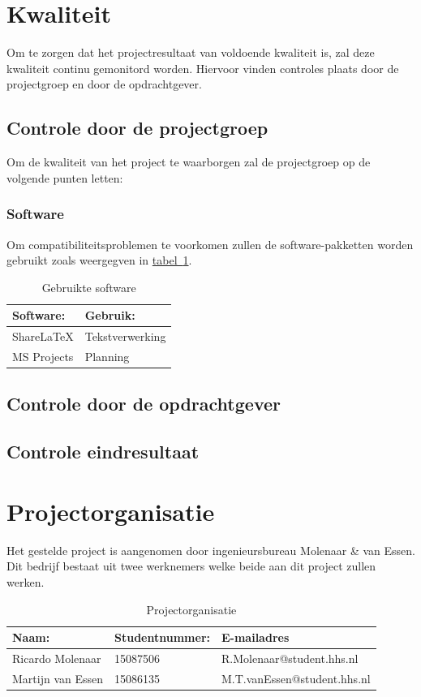 \documentclass[numbers=endperiod]{scrartcl}
\newcommand{\sectionSmall}[1]{
	\vspace{-10pt}
	\section{#1}
	\vspace{-5pt}
}
\newcommand{\tableref}[1]{\hyperref[table:#1]{tabel~\ref{table:#1}}}
\begin{document}
	\sectionSmall{Kwaliteit}
	Om te zorgen dat het projectresultaat van voldoende kwaliteit is, zal deze kwaliteit continu gemonitord worden. Hiervoor vinden controles plaats door de projectgroep en door de opdrachtgever.
	\subsection{Controle door de projectgroep}
	Om de kwaliteit van het project te waarborgen zal de projectgroep op de volgende punten letten:
	\subsubsection{Software}
	Om compatibiliteitsproblemen te voorkomen zullen de software-pakketten worden gebruikt zoals weergegven in \tableref{Software}.
	
	\begin{table}[h]
		\caption{Gebruikte software}\label{table:Software}
		
		\centering
		\begin{tabular}{ p{} | p{} }
			Software:	    & Gebruik:          \\ \hline
			ShareLaTeX   	& Tekstverwerking	\\
			MS Projects    	& Planning  		\\
		\end{tabular}
		
	\end{table}
	
	\subsection{Controle door de opdrachtgever}
	\subsection{Controle eindresultaat}
	\sectionSmall{Projectorganisatie}
	Het gestelde project is aangenomen door ingenieursbureau Molenaar \& van Essen. Dit bedrijf bestaat uit
	twee werknemers welke beide aan dit project zullen werken. 
	\begin{table}[h]
		\caption{Projectorganisatie}\label{table:Projectorganisatie}
		
		\centering
		\begin{tabular}{ p{} | p{} | p{} }
			Naam: 				& Studentnummer:& E-mailadres \\ \hline
			Ricardo Molenaar 	& 15087506	 	& R.Molenaar@student.hhs.nl \\
			Martijn van Essen 	& 15086135		& M.T.vanEssen@student.hhs.nl \\
		\end{tabular}
		
	\end{table}
	\newpage
	
\end{document}
